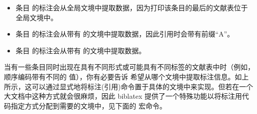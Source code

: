 \begin{itemize}
\item %
条目  的标注会从全局文境中提取数据，因为打印该条目的最后的文献表位于全局文境中。
\item %
条目  的标注会从带有  的文境中提取数据，因此引用时会带有前缀“A”。
\item %
条目  的标注会从带有  的文境中提取数据。
\end{itemize}
%
当有一些条目同时出现在具有不同形式或可能具有不同标签的文献表中时（例如，顺序编码带有不同的  值），你有必要告诉 \biblatex 希望从哪个文境中提取标注信息。如上所示，这可以通过显式地将标注(引用)命令置于具体的文境中来实现。但若在一个大文档中这种方式就会很麻烦，因此 biblatex 提供了一个特殊功能以将标注用代码指定方式分配到需要的文境中，见下面的  宏命令。

